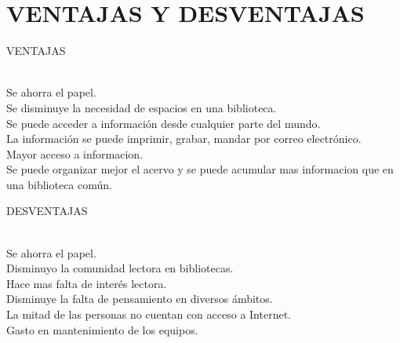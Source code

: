 \section{VENTAJAS Y DESVENTAJAS} 

\begin{enumerate}[7.]

	\begin{center}
	\item VENTAJAS
	\end{center}
  \\ Se ahorra el papel. 
  \\ Se disminuye la  necesidad de espacios en una biblioteca.  
  \\ Se puede acceder a información desde cualquier parte del mundo.  
  \\ La información se puede imprimir, grabar, mandar por correo electrónico. 
  \\ Mayor acceso a informacion. 
  \\ Se puede organizar mejor el acervo  y se puede acumular mas  informacion que en una biblioteca común.
  \\
	\begin{center}
	\item DESVENTAJAS
	\end{center}
	\\ Se ahorra el papel. 
  \\ Disminuyo la comunidad lectora en bibliotecas. 
  \\ Hace mas falta de interés lectora. 
  \\ Disminuye la falta de pensamiento en diversos ámbitos.  
  \\ La mitad de las personas no cuentan con acceso a Internet. 
  \\ Gasto en mantenimiento de los equipos. 


\end{enumerate} 
